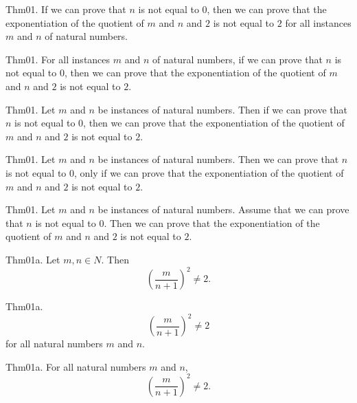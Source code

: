\documentclass{article}
\begin{document}
Thm01. If we can prove that $n$ is not equal to $0$, then we can prove that the exponentiation of the quotient of $m$ and $n$ and $2$ is not equal to $2$ for all instances $m$ and $n$ of natural numbers.

Thm01. For all instances $m$ and $n$ of natural numbers, if we can prove that $n$ is not equal to $0$, then we can prove that the exponentiation of the quotient of $m$ and $n$ and $2$ is not equal to $2$.

Thm01. Let $m$ and $n$ be instances of natural numbers. Then if we can prove that $n$ is not equal to $0$, then we can prove that the exponentiation of the quotient of $m$ and $n$ and $2$ is not equal to $2$.

Thm01. Let $m$ and $n$ be instances of natural numbers. Then we can prove that $n$ is not equal to $0$, only if we can prove that the exponentiation of the quotient of $m$ and $n$ and $2$ is not equal to $2$.

Thm01. Let $m$ and $n$ be instances of natural numbers. Assume that we can prove that $n$ is not equal to $0$. Then we can prove that the exponentiation of the quotient of $m$ and $n$ and $2$ is not equal to $2$.

Thm01a. Let $m , n \in N$. Then $$(\frac{ m}{n + 1})^ {2}\neq 2.$$

Thm01a. $$(\frac{ m}{n + 1})^ {2}\neq 2$$ for all natural numbers $m$ and $n$.

Thm01a. For all natural numbers $m$ and $n$, $$(\frac{ m}{n + 1})^ {2}\neq 2.$$
\end{document}

